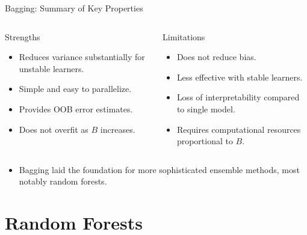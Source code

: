 \begin{frame}{Bagging: Summary of Key Properties}
  \begin{columns}[t]
      \begin{block}{Strengths}
        \begin{itemize}
          \item \alert{Reduces variance} substantially for unstable learners.
          \item Simple and easy to parallelize.
          \item Provides OOB error estimates.
          \item Does not overfit as $B$ increases.
        \end{itemize}
      \end{block}
      \begin{block}{Limitations}
        \begin{itemize}
          \item Does \alert{not reduce bias}.
          \item Less effective with stable learners.
          \item Loss of interpretability compared to single model.
          \item Requires computational resources proportional to $B$.
        \end{itemize}
      \end{block}
  \end{columns}
  \vspace{0.6em}
  \begin{itemize}
    \item Bagging laid the foundation for more sophisticated ensemble methods, most notably
          \alert{random forests}.
  \end{itemize}
\end{frame}

\section{Random Forests}

